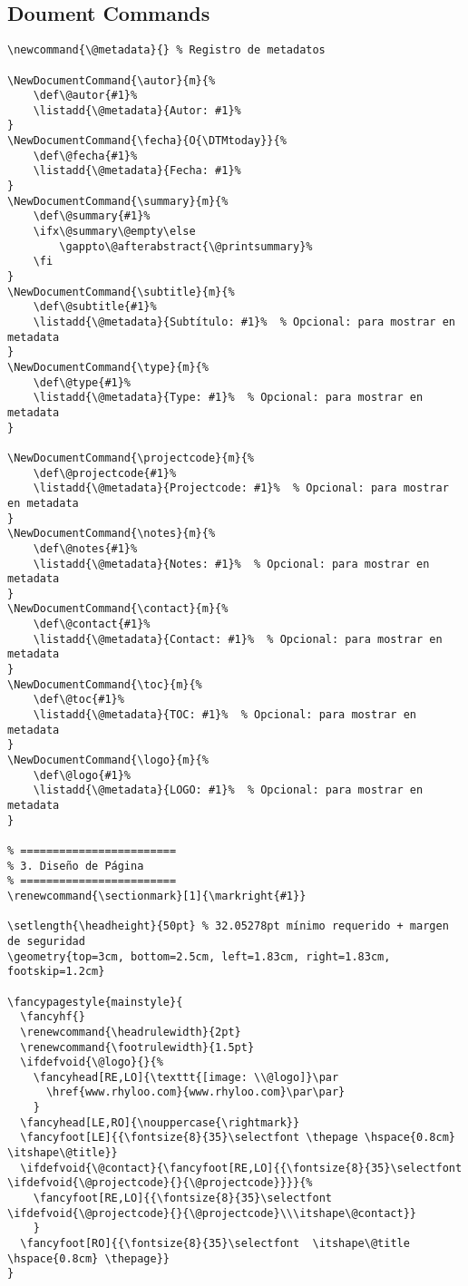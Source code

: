 \documentclass{reporti}
\begin{document}
\subsection{Doument Commands}
\label{sec:orge967a07}
\begin{verbatim}
\newcommand{\@metadata}{} % Registro de metadatos

\NewDocumentCommand{\autor}{m}{%
    \def\@autor{#1}%
    \listadd{\@metadata}{Autor: #1}%
}
\NewDocumentCommand{\fecha}{O{\DTMtoday}}{%
    \def\@fecha{#1}%
    \listadd{\@metadata}{Fecha: #1}%
}
\NewDocumentCommand{\summary}{m}{%
    \def\@summary{#1}%
    \ifx\@summary\@empty\else
        \gappto\@afterabstract{\@printsummary}%
    \fi
}
\NewDocumentCommand{\subtitle}{m}{%
    \def\@subtitle{#1}%
    \listadd{\@metadata}{Subtítulo: #1}%  % Opcional: para mostrar en metadata
}
\NewDocumentCommand{\type}{m}{%
    \def\@type{#1}%
    \listadd{\@metadata}{Type: #1}%  % Opcional: para mostrar en metadata
}

\NewDocumentCommand{\projectcode}{m}{%
    \def\@projectcode{#1}%
    \listadd{\@metadata}{Projectcode: #1}%  % Opcional: para mostrar en metadata
}
\NewDocumentCommand{\notes}{m}{%
    \def\@notes{#1}%
    \listadd{\@metadata}{Notes: #1}%  % Opcional: para mostrar en metadata
}
\NewDocumentCommand{\contact}{m}{%
    \def\@contact{#1}%
    \listadd{\@metadata}{Contact: #1}%  % Opcional: para mostrar en metadata
}
\NewDocumentCommand{\toc}{m}{%
    \def\@toc{#1}%
    \listadd{\@metadata}{TOC: #1}%  % Opcional: para mostrar en metadata
}
\NewDocumentCommand{\logo}{m}{%
    \def\@logo{#1}%
    \listadd{\@metadata}{LOGO: #1}%  % Opcional: para mostrar en metadata
}

% ========================
% 3. Diseño de Página
% ========================
\renewcommand{\sectionmark}[1]{\markright{#1}}

\setlength{\headheight}{50pt} % 32.05278pt mínimo requerido + margen de seguridad
\geometry{top=3cm, bottom=2.5cm, left=1.83cm, right=1.83cm, footskip=1.2cm}

\fancypagestyle{mainstyle}{
  \fancyhf{}
  \renewcommand{\headrulewidth}{2pt}
  \renewcommand{\footrulewidth}{1.5pt}
  \ifdefvoid{\@logo}{}{%
    \fancyhead[RE,LO]{\texttt{[image: \\@logo]}\par
      \href{www.rhyloo.com}{www.rhyloo.com}\par\par}
    }
  \fancyhead[LE,RO]{\nouppercase{\rightmark}}
  \fancyfoot[LE]{{\fontsize{8}{35}\selectfont \thepage \hspace{0.8cm} \itshape\@title}}
  \ifdefvoid{\@contact}{\fancyfoot[RE,LO]{{\fontsize{8}{35}\selectfont \ifdefvoid{\@projectcode}{}{\@projectcode}}}}{%
    \fancyfoot[RE,LO]{{\fontsize{8}{35}\selectfont \ifdefvoid{\@projectcode}{}{\@projectcode}\\\itshape\@contact}}
    }
  \fancyfoot[RO]{{\fontsize{8}{35}\selectfont  \itshape\@title \hspace{0.8cm} \thepage}}
}


\end{verbatim}
\end{document}
